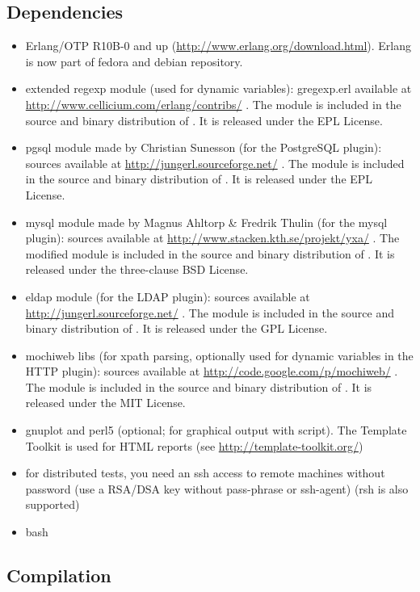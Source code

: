 \documentclass{IDXDOC-en}
\begin{document}
\subsection{Dependencies}
\begin{itemize}
\item Erlang/OTP R10B-0 and up
  (\url{http://www.erlang.org/download.html}). Erlang is now
  part of fedora and debian repository.
  \item extended regexp module (used for dynamic variables):
    gregexp.erl available at
    \url{http://www.cellicium.com/erlang/contribs/} . The module is
    included in the source and binary distribution of . It
    is released under the EPL License.
  \item pgsql module made by Christian Sunesson (for the PostgreSQL plugin):
    sources available at
    \url{http://jungerl.sourceforge.net/} . The module is
    included in the source and binary distribution of . It
    is released under the EPL License.
  \item mysql module made by Magnus Ahltorp \& Fredrik Thulin  (for the mysql plugin):
    sources available at
    \url{http://www.stacken.kth.se/projekt/yxa/} . The modified module is
    included in the source and binary distribution of . It
    is released under the three-clause BSD License.
  \item eldap module  (for the LDAP plugin):
    sources available at
    \url{http://jungerl.sourceforge.net/} . The module is
    included in the source and binary distribution of . It
    is released under the GPL License.
  \item mochiweb libs (for xpath parsing, optionally used for dynamic variables in
    the HTTP plugin):
    sources available at
    \url{http://code.google.com/p/mochiweb/} . The module is
    included in the source and binary distribution of . It
    is released under the MIT License.
   \item  gnuplot and perl5 (optional; for graphical output with
     script).  The Template Toolkit is used for HTML
    reports (see \url{http://template-toolkit.org/})
  \item for distributed tests, you need an ssh access to remote
    machines without password (use a RSA/DSA key without pass-phrase or
    ssh-agent) (rsh is also supported)
\item bash
\end{itemize}
\subsection{Compilation}
\end{document}
